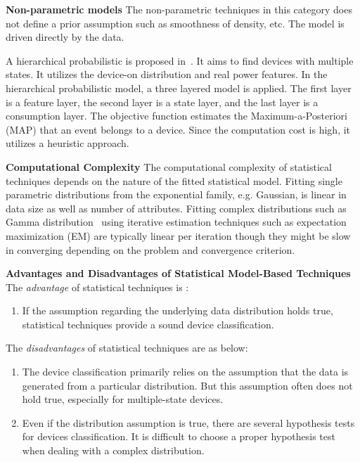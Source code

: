 \textbf{Non-parametric models}
The non-parametric techniques in this category does not 
define a  prior assumption such as smoothness of density, etc.
The model is driven directly by the data.

A hierarchical probabilistic is proposed in~\cite{wang2013heirarchical}.
It aims to find devices with multiple states. 
It utilizes the device-on distribution and real power features. 
In the hierarchical probabilistic model, a three layered model is applied. 
The first layer is a feature layer, the second layer is a state layer, 
and the last layer is a consumption layer. 
The objective function estimates the Maximum-a-Posteriori (MAP) 
that an event belongs to a device. 
Since the computation cost is high, it 
utilizes a heuristic approach. 


\textbf{Computational Complexity}
The computational complexity of statistical techniques 
depends on the nature of the fitted statistical model.
Fitting single parametric distributions from the exponential family, 
e.g. Gaussian, is linear in data size as well as number of attributes. 
Fitting complex distributions such as Gamma distribution~\cite{kim2011unsupervised} 
using iterative 
estimation techniques such as expectation maximization (EM) are 
typically linear per iteration though they might be slow 
in converging depending on the problem and convergence criterion. 

\textbf{Advantages and Disadvantages of Statistical Model-Based Techniques}
The \textit{advantage} of statistical techniques is :
\begin{enumerate}
\item If the assumption regarding the underlying data distribution 
holds true, statistical techniques provide a sound device classification. 
\end{enumerate}
The \textit{disadvantages} of statistical techniques are as below:
\begin{enumerate}
\item The device classification primarily relies on the assumption 
that the data is generated from a particular distribution. 
But this assumption often does not hold true, especially for multiple-state 
devices. 
\item Even if the distribution assumption is true, 
there are several hypothesis tests for devices classification. 
It is difficult to choose a proper hypothesis test when dealing with a complex distribution. 
\end{enumerate}

